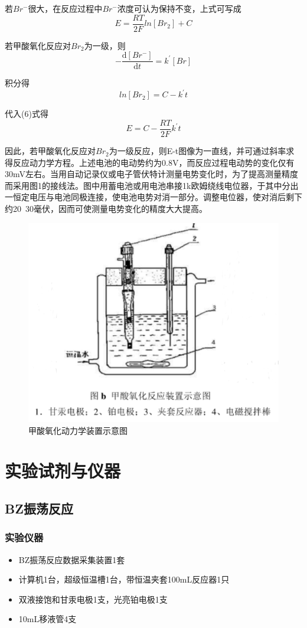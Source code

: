 \documentclass[12pt,hyperref,a4paper,UTF8]{ctexart}
\begin{document}
若$Br^-$很大，在反应过程中$Br^-$浓度可认为保持不变，上式可写成
\begin{equation}
    E = \frac{RT}{2F}ln{[Br_2]} + C
\end{equation}

若甲酸氧化反应对$Br_2$为一级，则
\begin{equation}
    - \frac{\mathrm{d}{[Br^{-}]}}{\mathrm{d}t} = k^{'}{[Br]}
\end{equation}

积分得
\begin{equation}
    ln[Br_2] = C- k^{'}t
\end{equation}

代入(6)式得
\begin{equation}
    E = C - \frac{RT}{2F}k^{'}t
\end{equation}

因此，若甲酸氧化反应对$Br_2$为一级反应，则E-t图像为一直线，并可通过斜率求得反应动力学方程。上述电池的电动势约为0.8V，而反应过程电动势的变化仅有30mV左右。当用自动记录仪或电子管伏特计测量电势变化时，为了提高测量精度而采用图1的接线法。图中用蓄电池或用电池串接1k欧姆绕线电位器，于其中分出一恒定电压与电池同极连接，使电池电势对消一部分。调整电位器，使对消后剩下约20~30毫伏，因而可使测量电势变化的精度大大提高。
\begin{figure}[htp]
    \centering
    \includegraphics[width=0.5\linewidth]{3.png}
    \caption{甲酸氧化动力学装置示意图}
    \label{fig:enter-label3}
\end{figure}

\section{实验试剂与仪器}
\subsection{BZ振荡反应}
\subsubsection{实验仪器}
\begin{itemize}
    \item BZ振荡反应数据采集装置1套
    \item 计算机1台，超级恒温槽1台，带恒温夹套100mL反应器1只
    \item 双液接饱和甘汞电极1支，光亮铂电极1支
    \item 10mL移液管4支
\end{itemize}
\end{document}
